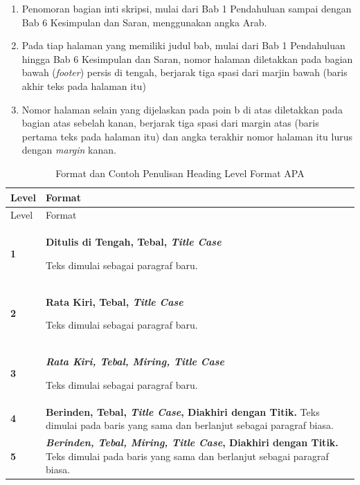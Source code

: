 \documentclass[
  indonesian,
  letterpaper,
]{scrbook}
\providecommand{\tightlist}{%
  \setlength{\itemsep}{0pt}\setlength{\parskip}{0pt}}
\begin{document}
\begin{enumerate}
\def\labelenumi{\alph{enumi}.}
\tightlist
\item
  Penomoran bagian inti skripsi, mulai dari Bab 1 Pendahuluan sampai
  dengan Bab 6 Kesimpulan dan Saran, menggunakan angka Arab.
\item
  Pada tiap halaman yang memiliki judul bab, mulai dari Bab 1
  Pendahuluan hingga Bab 6 Kesimpulan dan Saran, nomor halaman
  diletakkan pada bagian bawah (\emph{footer}) persis di tengah,
  berjarak tiga spasi dari marjin bawah (baris akhir teks pada halaman
  itu)
\item
  Nomor halaman selain yang dijelaskan pada poin b di atas diletakkan
  pada bagian atas sebelah kanan, berjarak tiga spasi dari margin atas
  (baris pertama teks pada halaman itu) dan angka terakhir nomor halaman
  itu lurus dengan \emph{margin} kanan.
\end{enumerate}

\begin{longtable}[]{@{}
  >{\centering\arraybackslash}p{}
  >{\raggedright\arraybackslash}p{}@{}}
\caption{Format dan Contoh Penulisan Heading Level Format
APA}\label{tbl-headinglevel}\tabularnewline
\toprule\noalign{}
\begin{minipage}[b]{\linewidth}\centering
Level
\end{minipage} & \begin{minipage}[b]{\linewidth}\raggedright
Format
\end{minipage} \\
\midrule\noalign{}
\endfirsthead
\toprule\noalign{}
\begin{minipage}[b]{\linewidth}\centering
Level
\end{minipage} & \begin{minipage}[b]{\linewidth}\raggedright
Format
\end{minipage} \\
\midrule\noalign{}
\endhead
\bottomrule\noalign{}
\endlastfoot
\textbf{1} & \textbf{Ditulis di Tengah, Tebal, \emph{Title Case}}

Teks dimulai sebagai paragraf baru. \\
\textbf{2} & \textbf{Rata Kiri, Tebal, \emph{Title Case}}

Teks dimulai sebagai paragraf baru. \\
\textbf{3} & \textbf{\emph{Rata Kiri, Tebal, Miring, Title Case}}

Teks dimulai sebagai paragraf baru. \\
\textbf{4} & \textbf{Berinden, Tebal, \emph{Title Case}, Diakhiri dengan
Titik.} Teks dimulai pada baris yang sama dan berlanjut sebagai paragraf
biasa. \\
\textbf{5} & \textbf{\emph{Berinden, Tebal, Miring, Title Case},
Diakhiri dengan Titik.} Teks dimulai pada baris yang sama dan berlanjut
sebagai paragraf biasa. \\
\end{longtable}


\backmatter
\end{document}
